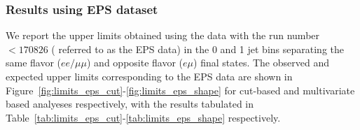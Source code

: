 \subsubsection{Results using EPS dataset}
We report the upper limits obtained using the data with the run number 
$<170826$ ( referred to as the EPS data) in the 0 and 1 jet bins separating the 
same flavor ($ee/\mu\mu$) and opposite flavor ($e\mu$) final states.
The observed and expected upper limits corresponding to the EPS data are shown in 
Figure~\ref{fig:limits_eps_cut}-\ref{fig:limits_eps_shape} for cut-based and multivariate 
based analyeses respectively, with the results tabulated in 
Table~\ref{tab:limits_eps_cut}-\ref{tab:limits_eps_shape} respectively.


\begin{figure}[!htbp]
\centering
{}

\end{figure}
